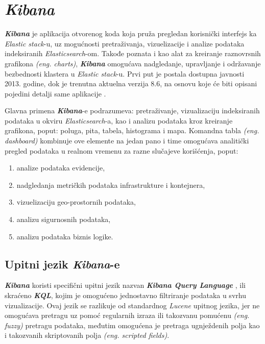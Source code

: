 \section{\textit{\textbf{Kibana}}}
\textit{\textbf{Kibana}} je aplikacija otvorenog koda koja pruža pregledan korisnički interfejs ka \textit{Elastic stack}-u, uz mogućnosti pretraživanja, vizuelizacije i analize podataka indeksiranih \textit{Elasticsearch}-om. Takođe poznata i kao alat za kreiranje raznovrsnih grafikona \textit{(eng. charts)}, \textit{\textbf{Kibana}} omogućava nadgledanje, upravljanje i održavanje bezbednosti klastera u \textit{Elastic stack}-u. Prvi put je postala dostupna javnosti 2013. godine, dok je trenutna aktuelna verzija 8.6, na osnovu koje će biti opisani pojedini detalji same aplikacije \cite{elastic-kibana}.

\par
Glavna primena \textit{\textbf{Kibana}}-e podrazumeva: pretraživanje, vizualizaciju indeksiranih podataka u okviru \textit{Elasticsearch}-a, kao i analizu podataka kroz kreiranje grafikona, poput: poluga, pita, tabela, histograma i mapa. Komandna tabla \textit{(eng. dashboard)} kombinuje ove elemente na jedan pano i time omogućava analitički pregled podataka u realnom vremenu za razne slučajeve korišćenja, poput:
\begin{enumerate}
    \item analize podataka evidencije, 
    \item nadgledanja metričkih podataka infrastrukture i kontejnera, 
    \item vizuelizaciju geo-prostornih podataka, 
    \item analizu sigurnosnih podataka, 
    \item analizu podataka biznis logike.
\end{enumerate}

\subsection{Upitni jezik \textit{\textbf{Kibana}}-e}
\textit{\textbf{Kibana}} koristi specifični upitni jezik nazvan \textit{\textbf{Kibana Query Language}} \cite{kql}, ili skraćeno \textit{\textbf{KQL}}, kojim je omogućeno jednostavno filtriranje podataka u svrhu vizualizacije. Ovaj jezik se razlikuje od standardnog \textit{Lucene }upitnog jezika, jer ne omogućava pretragu uz pomoć regularnih izraza ili takozvanu pomućenu \textit{(eng. fuzzy)} pretragu podataka, međutim omogućena je pretraga ugnježdenih polja kao i takozvanih skriptovanih polja \textit{(eng. scripted fields)}.

